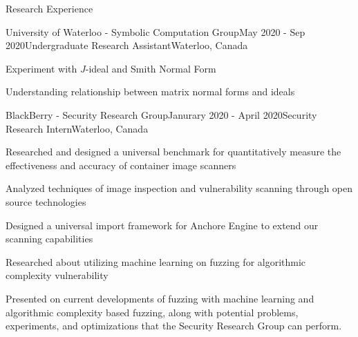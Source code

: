 \documentclass{cv}
\begin{document}
\begin{rSection}{Research Experience}
\begin{rSubsection}{University of Waterloo - Symbolic Computation Group}{May 2020 - Sep 2020}{Undergraduate Research Assistant}{Waterloo, Canada}
	\item Experiment with $J$-ideal and Smith Normal Form
  \item Understanding relationship between matrix normal forms and ideals
\end{rSubsection}

\begin{rSubsection}{BlackBerry - Security Research Group}{Janurary 2020 - April 2020}{Security Research Intern}{Waterloo, Canada}
	\item Researched and designed a universal benchmark for quantitatively measure the effectiveness and accuracy of container image scanners
	\item Analyzed techniques of image inspection and vulnerability scanning through open source technologies
	\item Designed a universal import framework for Anchore Engine to extend our scanning capabilities
  \item Researched about utilizing machine learning on fuzzing for algorithmic complexity vulnerability
  \item Presented on current developments of fuzzing with machine learning and algorithmic complexity based fuzzing, along with potential problems, experiments, and optimizations that the Security Research Group can perform.
\end{rSubsection}
\end{rSection}
\end{document}
